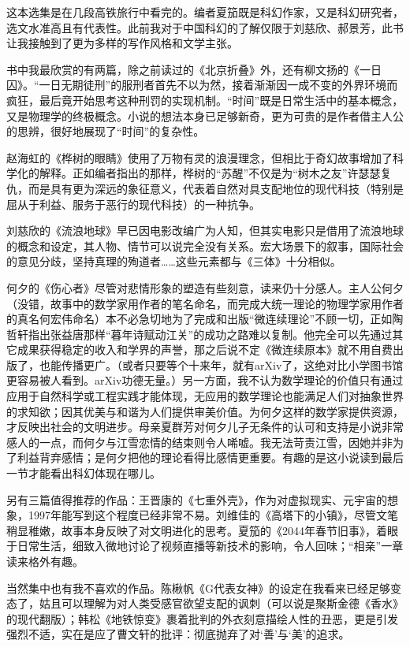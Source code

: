 \par 这本选集是在几段高铁旅行中看完的。编者夏笳既是科幻作家，又是科幻研究者，选文水准高且有代表性。此前我对于中国科幻的了解仅限于刘慈欣、郝景芳，此书让我接触到了更为多样的写作风格和文学主张。
\par 书中我最欣赏的有两篇，除之前读过的《北京折叠》外，还有柳文扬的《一日囚》。“一日无期徒刑”的服刑者首先不以为然，接着渐渐因一成不变的外界环境而疯狂，最后竟开始思考这种刑罚的实现机制。“时间”既是日常生活中的基本概念，又是物理学的终极概念。小说的想法本身已足够新奇，更为可贵的是作者借主人公的思辨，很好地展现了“时间”的复杂性。
\par 赵海虹的《桦树的眼睛》使用了万物有灵的浪漫理念，但相比于奇幻故事增加了科学化的解释。正如编者指出的那样，桦树的“苏醒”不仅是为“树木之友”许瑟瑟复仇，而是具有更为深远的象征意义，代表着自然对具支配地位的现代科技（特别是屈从于利益、服务于恶行的现代科技）的一种抗争。
\par 刘慈欣的《流浪地球》早已因电影改编广为人知，但其实电影只是借用了流浪地球的概念和设定，其人物、情节可以说完全没有关系。宏大场景下的叙事，国际社会的意见分歧，坚持真理的殉道者……这些元素都与《三体》十分相似。
\par 何夕的《伤心者》尽管对悲情形象的塑造有些刻意，读来仍十分感人。主人公何夕（没错，故事中的数学家用作者的笔名命名，而完成大统一理论的物理学家用作者的真名何宏伟命名）本不必急切地为了完成和出版“微连续理论”不顾一切，正如陶哲轩指出张益唐那样“暮年诗赋动江关”的成功之路难以复制。他完全可以先通过其它成果获得稳定的收入和学界的声誉，那之后说不定《微连续原本》就不用自费出版了，也能传播更广。（或者只要等个十来年，就有arXiv了，这绝对比小学图书馆更容易被人看到。arXiv功德无量。）另一方面，我不认为数学理论的价值只有通过应用于自然科学或工程实践才能体现，无应用的数学理论也能满足人们对抽象世界的求知欲；因其优美与和谐为人们提供审美价值。为何夕这样的数学家提供资源，才反映出社会的文明进步。母亲夏群芳对何夕儿子无条件的认可和支持是小说非常感人的一点，而何夕与江雪恋情的结束则令人唏嘘。我无法苛责江雪，因她并非为了利益背弃感情；是何夕把他的理论看得比感情更重要。有趣的是这小说读到最后一节才能看出科幻体现在哪儿。
\par 另有三篇值得推荐的作品：王晋康的《七重外壳》，作为对虚拟现实、元宇宙的想象，1997年能写到这个程度已经非常不易。刘维佳的《高塔下的小镇》，尽管文笔稍显稚嫩，故事本身反映了对文明进化的思考。夏笳的《2044年春节旧事》，着眼于日常生活，细致入微地讨论了视频直播等新技术的影响，令人回味；“相亲”一章读来格外有趣。
\par 当然集中也有我不喜欢的作品。陈楸帆《G代表女神》的设定在我看来已经足够变态了，姑且可以理解为对人类受感官欲望支配的讽刺（可以说是聚斯金德《香水》的现代翻版）；韩松《地铁惊变》裹着批判的外衣刻意描绘人性的丑恶，更是引发强烈不适，实在是应了曹文轩的批评：彻底抛弃了对‘善’与‘美’的追求。
\par {}


